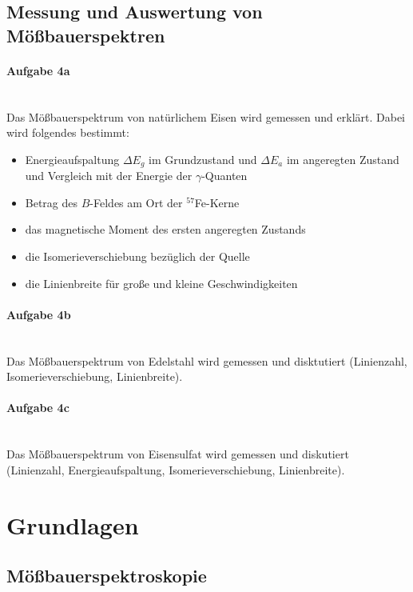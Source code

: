 \documentclass[a4paper,twoside,final]{article}
\begin{document}
\subsection{Messung und Auswertung von Mößbauerspektren}
\paragraph{Aufgabe 4a}$~$\\
Das Mößbauerspektrum von natürlichem Eisen wird gemessen und erklärt.
Dabei wird folgendes bestimmt:
\begin{itemize}
  \item Energieaufspaltung $\Delta E_g$ im Grundzustand und $\Delta E_a$ im angeregten Zustand und Vergleich mit der Energie der $\gamma$-Quanten
  \item Betrag des $B$-Feldes am Ort der $^{57}$Fe-Kerne
  \item das magnetische Moment des ersten angeregten Zustands
  \item die Isomerieverschiebung bezüglich der Quelle
  \item die Linienbreite für große und kleine Geschwindigkeiten
\end{itemize}
\paragraph{Aufgabe 4b}$~$\\
Das Mößbauerspektrum von Edelstahl wird gemessen und disktutiert (Linienzahl, Isomerieverschiebung, Linienbreite).
\paragraph{Aufgabe 4c}$~$\\
Das Mößbauerspektrum von Eisensulfat wird gemessen und diskutiert (Linienzahl, Energieaufspaltung, Isomerieverschiebung, Linienbreite).
\newpage
\section{Grundlagen} \label{sec:Grundlagen}
\subsection{Mößbauerspektroskopie}
\end{document}
